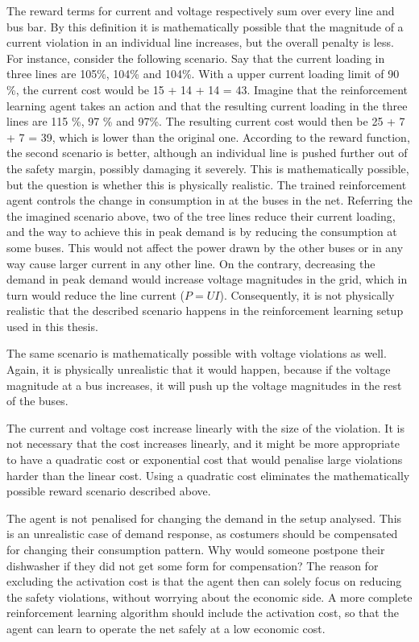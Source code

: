 \documentclass[class=book, crop=false, 11pt]{standalone}
\begin{document}
The reward terms for current and voltage respectively sum over every line and bus bar. By this definition it is mathematically possible that the magnitude of a current violation in an individual line increases, but the overall penalty is less. For instance, consider the following scenario. Say that the current loading in three lines are 105\%, 104\% and 104\%. With a upper current loading limit of 90 \%, the current cost would be 15 + 14 + 14 = 43. Imagine that the reinforcement learning agent takes an action and that the resulting current loading in the three lines are 115 \%, 97 \% and 97\%. The resulting current cost would then be 25 + 7 + 7 = 39, which  is lower than the original one. According to the reward function, the second scenario is better, although an individual line is pushed further out of the safety margin, possibly damaging it severely. This is mathematically possible, but the question is whether this is physically realistic. The trained reinforcement agent controls the change in consumption in at the buses in the net. Referring the the imagined scenario above, two of the tree lines reduce their current loading, and the way to achieve this in peak demand is by reducing the consumption at some buses. This would not affect the power drawn by the other buses or in any way cause larger current in any other line. On the contrary, decreasing the demand in peak demand would increase voltage magnitudes in the grid, which in turn would reduce the line current ($P = UI$). Consequently, it is not physically realistic that the described scenario happens in the reinforcement learning setup used in this thesis.

The same scenario is mathematically possible with voltage violations as well. Again, it is physically unrealistic that it would happen, because if the voltage magnitude at a bus increases, it will push up the voltage magnitudes in the rest of the buses.

The current and voltage cost increase linearly with the size of the violation. It is not necessary that the cost increases linearly, and it might be more appropriate to have a quadratic cost or exponential cost that would penalise large violations harder than the linear cost. Using a quadratic cost eliminates the mathematically possible reward scenario described above.

The agent is not penalised for changing the demand in the setup analysed. This is an unrealistic case of demand response, as costumers should be compensated for changing their consumption pattern. Why would someone postpone their dishwasher if they did not get some form for compensation? The reason for excluding the activation cost is that the agent then can solely focus on reducing the safety violations, without worrying about the economic side. A more complete reinforcement learning algorithm should include the activation cost, so that the agent can learn to operate the net safely at a low economic cost. 
\end{document}
